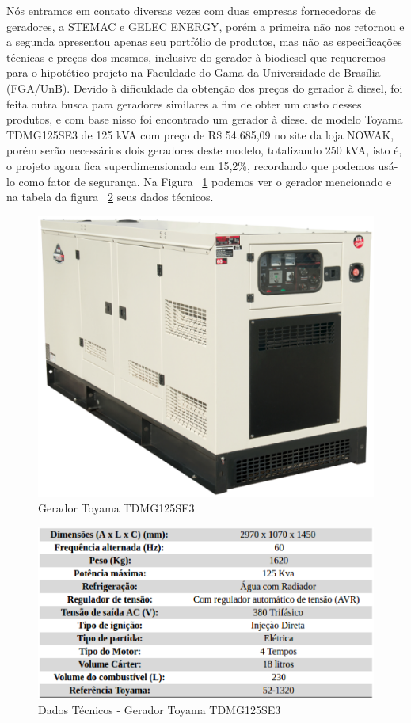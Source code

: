 Nós entramos em contato diversas vezes com duas empresas fornecedoras de geradores, a STEMAC e GELEC ENERGY, porém a primeira não nos retornou e a segunda apresentou apenas seu portfólio de produtos, mas não as especificações técnicas e preços dos mesmos, inclusive do gerador à biodiesel que requeremos para o hipotético projeto na Faculdade do Gama da Universidade de Brasília (FGA/UnB).
Devido à dificuldade da obtenção dos preços do gerador à diesel, foi feita outra busca para geradores similares a fim de obter um custo desses produtos, e com base nisso foi encontrado um gerador à diesel de modelo Toyama TDMG125SE3 de 125 kVA com preço de R\$ 54.685,09 no site da loja NOWAK, porém serão necessários dois geradores deste modelo, totalizando 250 kVA, isto é, o projeto agora fica superdimensionado em 15,2\%, recordando que podemos usá-lo como fator de segurança. Na Figura ~\ref{fig:gerador2} podemos ver o gerador mencionado e na tabela da figura ~\ref{fig:gerador2_tabela} seus dados técnicos.

\begin{figure}[!ht]
  \centering
  \includegraphics[keepaspectratio=true,scale=0.2]{figuras/gerador2.eps}
  \caption{Gerador Toyama TDMG125SE3}
  \label{fig:gerador2}
\end{figure}

\begin{figure}[!ht]
  \centering
  \includegraphics[keepaspectratio=true,scale=0.4]{figuras/SmartGrid_Dados_gerador_biodisel.eps}
  \caption{Dados Técnicos - Gerador Toyama TDMG125SE3}
  \label{fig:gerador2_tabela}
\end{figure}

